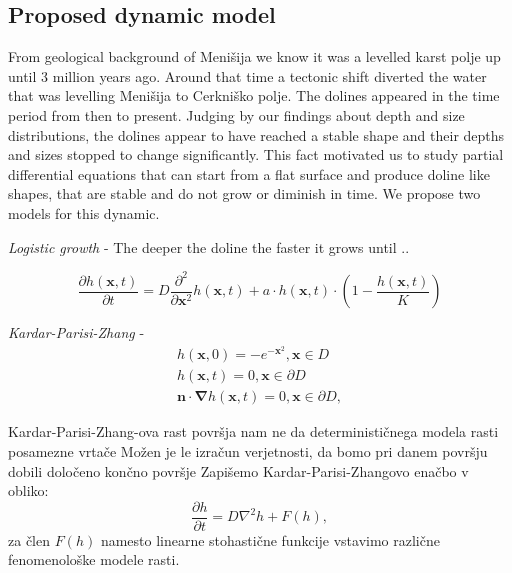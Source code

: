 \documentclass[a0,portrait]{a0poster}
\begin{document}
\begin{multicols}{2}

\section*{Proposed dynamic model}

From geological background of Menišija we know it was a levelled karst polje up until 3 million years ago. Around that time a tectonic shift diverted the water that was levelling Menišija to Cerkniško polje. The dolines appeared in the time period from then to present. Judging by our findings about depth and size distributions, the dolines appear to have reached a stable shape and their depths and sizes stopped to change significantly.
This fact motivated us to study partial differential equations that can start from a flat surface and produce doline like shapes, that are stable and do not grow or diminish in time.
We propose two models for this dynamic.

\textit{Logistic growth} - The deeper the doline the faster it grows until ..

\begin{equation}
	\frac{ \partial h(\mathbf{x},t) }{ \partial t} = D \frac{\partial^2}{\partial \mathbf{x}^2} h(\mathbf{x},t) + a \cdot h(\mathbf{x},t) \cdot (1 - \frac{h(\mathbf{x},t)}{K})
\end{equation} 

\textit{Kardar-Parisi-Zhang} - 
\begin{equation}
	\begin{aligned}
		h(\mathbf{x},0) =  - e^{-\mathbf{x}^2}, \mathbf{x} \in D \\
		h(\mathbf{x},t) = 0, \mathbf{x} \in \partial D \\
		\mathbf{n} \cdot \boldsymbol \nabla h(\mathbf{x},t) = 0, \mathbf{x} \in \partial D,
	\end{aligned}
\end{equation}

    Kardar-Parisi-Zhang-ova rast površja nam ne da determinističnega modela rasti posamezne vrtače
    Možen je le izračun verjetnosti, da bomo pri danem površju dobili določeno končno površje
    Zapišemo Kardar-Parisi-Zhangovo enačbo v obliko:
    \begin{equation} \frac{ \partial h}{ \partial t} = D \nabla^2 h + F(h), \end{equation}
    za člen $F(h)$ namesto linearne stohastične funkcije vstavimo različne fenomenološke modele rasti.



\end{multicols}
\end{document}
